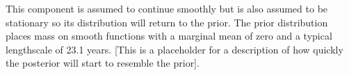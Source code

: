 This component is assumed to continue smoothly but is also assumed to be stationary so its distribution will return to the prior.
The prior distribution places mass on smooth functions with a marginal mean of zero and a typical lengthscale of 23.1 years.
[This is a placeholder for a description of how quickly the posterior will start to resemble the prior].